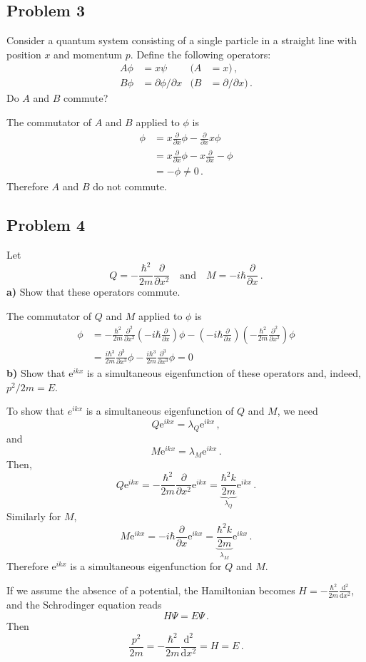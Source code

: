 \documentclass[letterpaper,10pt]{article}
\def\d{\mathrm{d}}
\def\e{\mathrm{e}}
\begin{document}
\subsection*{Problem 3}
Consider a quantum system consisting of a single particle in a straight line
with position $x$ and momentum $p$. Define the following operators:
\begin{align*}
A\phi&=x\psi & (A&=x)\,,\\
B\phi&=\partial\phi/\partial x & (B&=\partial/\partial x)\,.
\end{align*}
Do $A$ and $B$ commute?

The commutator of $A$ and $B$ applied to $\phi$ is
\begin{align*}
[A,B]\phi&=x\frac{\partial}{\partial x}\phi-\frac{\partial}{\partial x}x\phi\\
&=x\frac{\partial}{\partial x}\phi-x\frac{\partial}{\partial x}-\phi\\
&=-\phi\neq 0\,.
\end{align*}
Therefore $A$ and $B$ do not commute.

\subsection*{Problem 4}
Let
\[
Q=-\frac{\hbar^2}{2m}\frac{\partial}{\partial x^2}\quad\text{and}\quad
M=-i\hbar\frac{\partial}{\partial x}\,.
\]
\textbf{a)} Show that these operators commute.

The commutator of $Q$ and $M$ applied to $\phi$ is
\begin{align*}
[Q,M]\phi&=-\frac{\hbar^2}{2m}\frac{\partial^2}{\partial x^2}
\left(-i\hbar\frac{\partial}{\partial x}\right)\phi
-\left(-i\hbar\frac{\partial}{\partial x}\right)
\left(-\frac{\hbar^2}{2m}\frac{\partial^2}{\partial x^2}\right)\phi\\
&=\frac{i\hbar^3}{2m}\frac{\partial^3}{\partial x^3}\phi
-\frac{i\hbar^3}{2m}\frac{\partial^3}{\partial x^3}\phi=0
\end{align*}
\textbf{b)} Show that $\e^{ikx}$ is a simultaneous eigenfunction of these
operators and, indeed, $p^2/2m=E$.

To show that $e^{ikx}$ is a simultaneous eigenfunction of $Q$ and $M$, we need
\[
Q\e^{ikx}=\lambda_Q\e^{ikx}\,,
\]
and
\[
M\e^{ikx}=\lambda_M\e^{ikx}\,.
\]
Then,
\[
Q\e^{ikx}=-\frac{\hbar^2}{2m}\frac{\partial}{\partial
x^2}\e^{ikx}=\underbrace{\frac{\hbar^2k}{2m}}_
{\lambda_Q}
\e^{ikx}\,.
\]
Similarly for $M$,
\[
M\e^{ikx}=-i\hbar\frac{\partial}{\partial
x}\e^{ikx}=\underbrace{\frac{\hbar^2k}{2m}}_
{\lambda_M}
\e^{ikx}\,.
\]
Therefore $\e^{ikx}$ is a simultaneous eigenfunction for $Q$ and $M$.

If we assume the absence of a potential, the Hamiltonian becomes
$H=-\frac{\hbar^2}{2m}\frac{\d^2}{\d x^2}$, and the Schrodinger equation reads
\[
H\Psi=E\Psi\,.
\]
Then
\[
\frac{p^2}{2m}=-\frac{\hbar^2}{2m}\frac{\d^2}{\d x^2}=H=E\,.
\]
\end{document}
